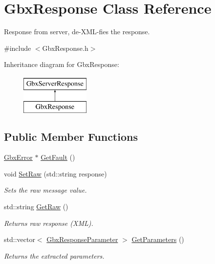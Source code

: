 \hypertarget{classGbxResponse}{\section{Gbx\-Response Class Reference}
\label{classGbxResponse}
}


Response from server, de-\/\-X\-M\-L-\/fies the response.  




{\ttfamily \#include $<$Gbx\-Response.\-h$>$}

Inheritance diagram for Gbx\-Response\-:\begin{figure}[H]
\begin{center}
\leavevmode
\includegraphics[height=2.000000cm]{classGbxResponse}
\end{center}
\end{figure}
\subsection*{Public Member Functions}
\begin{DoxyCompactItemize}
\item 
\hyperlink{structGbxError}{Gbx\-Error} $\ast$ \hyperlink{classGbxResponse_aaeb8f1ccd18ab88799d93ea78befc0df}{Get\-Fault} ()
\item 
void \hyperlink{classGbxResponse_aaf63a008c45be79f900e1131d0fb5565}{Set\-Raw} (std\-::string response)
\begin{DoxyCompactList}\small\item\em Sets the raw message value. \end{DoxyCompactList}\item 
\hypertarget{classGbxServerResponse_aa449d9a63899e1d1205e6ab916798ba6}{std\-::string \hyperlink{classGbxServerResponse_aa449d9a63899e1d1205e6ab916798ba6}{Get\-Raw} ()}\label{classGbxServerResponse_aa449d9a63899e1d1205e6ab916798ba6}

\begin{DoxyCompactList}\small\item\em Returns raw response (X\-M\-L). \end{DoxyCompactList}\item 
\hypertarget{classGbxServerResponse_a6d42bdaaeff3368e1fab2984940d2a2c}{std\-::vector$<$ \hyperlink{classGbxResponseParameter}{Gbx\-Response\-Parameter} $>$ \hyperlink{classGbxServerResponse_a6d42bdaaeff3368e1fab2984940d2a2c}{Get\-Parameters} ()}\label{classGbxServerResponse_a6d42bdaaeff3368e1fab2984940d2a2c}

\begin{DoxyCompactList}\small\item\em Returns the extracted parameters. \end{DoxyCompactList}\end{DoxyCompactItemize}
